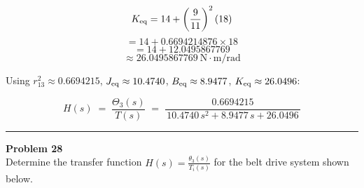 \[
K_{\rm eq} = 14 + \left(\frac{9}{11}\right)^2 (18)
\]
\[
= 14 + 0.6694214876 \times 18
\]
\[
= 14 + 12.0495867769
\]
\[
\approx 26.0495867769\ \mathrm{N\cdot m/rad}
\]


Using \(r_{13}^2\approx 0.6694215\), \(J_{\rm eq}\approx 10.4740\), \(B_{\rm eq}\approx 8.9477\), \(K_{\rm eq}\approx 26.0496\):

\[
\boxed{\;
H(s) \;=\; \frac{\Theta_3(s)}{T(s)} \;=\;
\frac{0.6694215}{\,10.4740\,s^2 + 8.9477\,s + 26.0496\,}
\;}
\]

\newpage

\noindent\rule{\textwidth}{1pt}
\noindent\textbf{Problem 28} \hfill
\\ Determine the transfer function \(H(s) = \frac{\theta_3(s)}{T_i(s)}\) for the belt drive system shown below.

